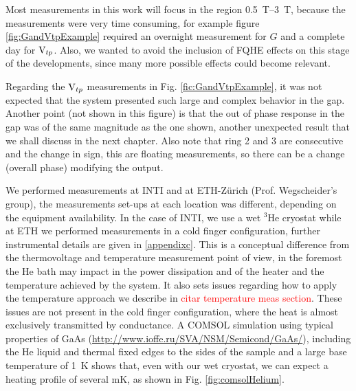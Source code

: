 Most measurements in this work will focus in the region \SIrange{0.5}{3}{\tesla}, because the measurements were very time consuming, for example figure \ref{fig:GandVtpExample} required an overnight measurement for $G$ and a complete day for $\text{V}_{tp}$. Also, we wanted to avoid the inclusion of FQHE effects on this stage of the developments, since many more possible effects could become relevant.

Regarding the $\text{V}_{tp}$  measurements in Fig. \ref{fic:GandVtpExample}, it was not expected that the system presented such large and complex behavior in the gap. Another point (not shown in this figure) is that the out of phase response in the gap was of the same magnitude as the one shown, another unexpected result that we shall discuss in the next chapter. Also note that ring 2 and 3 are consecutive and the change in sign, this are floating measurements, so there can be a change (overall phase) modifying the output. 


We performed measurements at INTI and at ETH-Zürich (Prof. Wegscheider's group), the measurements set-ups at each location was different, depending on the equipment availability. In the case of INTI, we use a wet $^3$He cryostat while at ETH we performed measurements in a cold finger configuration, further instrumental details are given in \ref{appendixc}. This is a conceptual difference from the thermovoltage and temperature measurement point of view, in the foremost the He bath may impact in the power dissipation and of the heater and the temperature achieved by the system. It also sets issues regarding how to apply the temperature approach we describe in \textcolor{red}{citar temperature meas section}. These issues are not present in the cold finger configuration, where the heat is almost exclusively transmitted by conductance. 
A COMSOL simulation using typical properties of GaAs (\url{http://www.ioffe.ru/SVA/NSM/Semicond/GaAs/}), including the He liquid and thermal fixed edges to the sides of the sample and a large base temperature of \SI{1}{\kelvin} shows that, even with our wet cryostat, we can expect a heating profile of several \si{\milli\kelvin}, as shown in Fig. \ref{fig:comsolHelium}.


